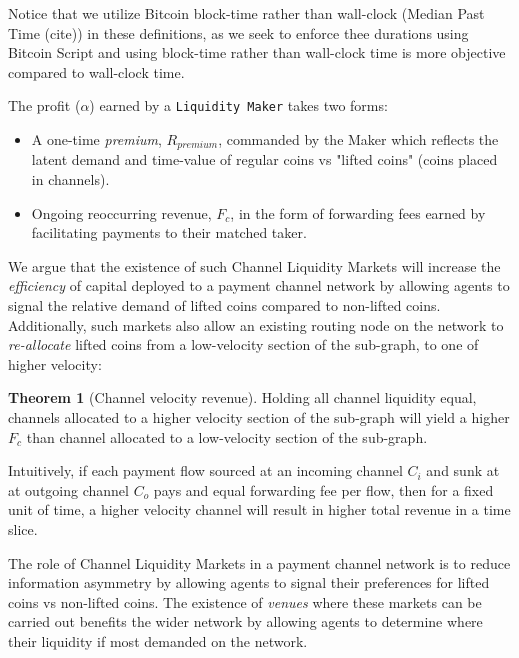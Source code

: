 \documentclass[12pt,a4paper]{article}
\theoremstyle{definition}
\newtheorem{theorem}{Theorem}[section]
\begin{document}
Notice that we utilize Bitcoin block-time rather than wall-clock (Median Past
Time (cite)) in these definitions, as we seek to enforce thee durations using
Bitcoin Script and using block-time rather than wall-clock time is more
objective compared to wall-clock time.

The profit ($\alpha$) earned by a \texttt{Liquidity Maker} takes two forms:
\begin{itemize}
   \item A one-time \emph{premium}, $R_{premium}$, commanded by the Maker which
       reflects the latent demand and time-value of regular coins vs "lifted
       coins" (coins placed in channels).

   \item Ongoing reoccurring revenue, $F_c$,  in the form of forwarding fees
       earned by facilitating payments to their matched taker.
\end{itemize}


We argue that the existence of such Channel Liquidity Markets will increase the
\emph{efficiency} of capital deployed to a payment channel network by allowing
agents to signal the relative demand of lifted coins compared to non-lifted
coins. Additionally, such markets also allow an existing routing node on the
network to \emph{re-allocate} lifted coins from a low-velocity section of the
sub-graph, to one of higher velocity:

\begin{theorem}[Channel velocity revenue] %
Holding all channel liquidity equal, channels allocated to a higher velocity
section of the sub-graph will yield a higher $F_c$  than channel allocated to a
low-velocity section of the sub-graph.
\end{theorem}

Intuitively, if each payment flow sourced at an incoming channel $C_i$ and sunk
at at outgoing channel $C_o$ pays and equal forwarding fee per flow, then for a
fixed unit of time, a higher velocity channel will result in higher total
revenue in a time slice.

The role of Channel Liquidity Markets in a payment channel network is to reduce
information asymmetry by allowing agents to signal their preferences for lifted
coins vs non-lifted coins. The existence of \emph{venues} where these markets
can be carried out benefits the wider network by allowing agents to determine
where their liquidity if most demanded on the network. %
\end{document}
